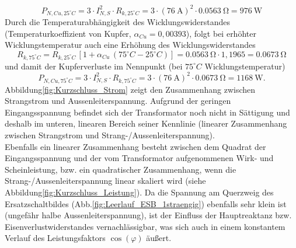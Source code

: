 \begin{equation}
    P_{N,Cu,25^{\circ}C}=3\cdot I_{N,S}^2\cdot R_{k,25^{\circ}C} = 3\cdot (\SI{76}{\ampere})^2\cdot \SI{0.0563}{\ohm}=\SI{976}{\watt}
\end{equation}
Durch die Temperaturabhängigkeit des Wicklungswiderstandes (Temperaturkoeffizient von Kupfer, $\alpha_{Cu}=0,00393$), folgt bei erhöhter Wicklungstemperatur auch eine Erhöhung des Wicklungswiderstandes
\begin{equation}
    R_{k,75^{\circ}C}=R_{k,25^{\circ}C}\,[1+\alpha_{Cu}\,(75^{\circ}C-25^{\circ}C)]=\SI{0.0563}{\ohm}\cdot 1,1965=\SI{0.0673}{\ohm}
\end{equation}
und damit der Kupferverluste im Nennpunkt (bei $75^{\circ}C$ Wicklungstemperatur)
\begin{equation}
    P_{N,Cu,75^{\circ}C}=3\cdot I_{N,S}^2\cdot R_{k,75^{\circ}C} = 3\cdot (\SI{76}{\ampere})^2\cdot \SI{0.0673}{\ohm}=\SI{1168}{\watt}.
\end{equation}
Abbildung\;\ref{fig:Kurzschluss_Strom} zeigt den Zusammenhang zwischen Strangstrom und Aussenleiterspannung. Aufgrund der geringen Eingangsspannung befindet sich der Transformator noch nicht in Sättigung und deshalb im unteren, linearen Bereich seiner Kennlinie (linearer Zusammenhang zwischen Strangstrom und Strang-/Aussenleiterspannung).\\
Ebenfalls ein linearer Zusammenhang besteht zwischen dem Quadrat der Eingangsspannung und der vom Transformator aufgenommenen Wirk- und Scheinleistung, bzw. ein quadratischer Zusammenhang, wenn die Strang-/Aussenleiterspannung linear skaliert wird (siehe Abbildung\;\ref{fig:Kurzschluss_Leistung}). Da die Spannung am Querzweig des Ersatzschaltbildes (Abb.\;\ref{fig:Leerlauf_ESB_1straengig}) ebenfalls sehr klein ist (ungefähr halbe Aussenleiterspannung), ist der Einfluss der Hauptreaktanz bzw. Eisenverlustwiderstandes vernachlässigbar, was sich auch in einem konstantem Verlauf des Leistungsfaktors $\cos(\varphi)$ äußert.


\clearpage
